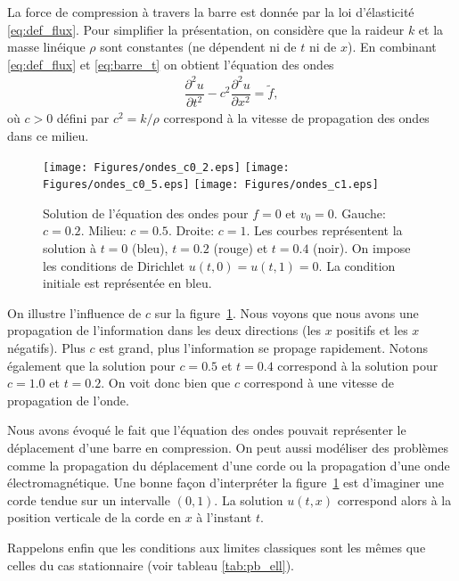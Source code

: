 \documentclass[12pt,a4paper,twoside]{article}
\begin{document}
La force de compression \`a travers la barre est donn\'ee par la loi d'\'elasticit\'e
\eqref{eq:def_flux}.
Pour simplifier la pr\'esentation, on consid\`ere que la raideur $k$ et la masse
lin\'eique $\rho$ sont constantes (ne d\'ependent ni de $t$ ni de $x$).
En combinant \eqref{eq:def_flux} et \eqref{eq:barre_t} on obtient l'\'equation des ondes
\begin{align}
  \label{eq:ondes}
  \dfrac{\partial^2 u}{\partial t^2} - c^2 \dfrac{\partial^2 u}{\partial x^2} = \widetilde{f} ,
\end{align}
o\`u $c>0$ d\'efini par $c^2 = k/\rho$ correspond \`a la vitesse de propagation
des ondes dans ce milieu.



\begin{figure}[h]
  \centering
  \texttt{[image: Figures/ondes\_c0\_2.eps]}
  \texttt{[image: Figures/ondes\_c0\_5.eps]}
  \texttt{[image: Figures/ondes\_c1.eps]}
  \caption{Solution de l'\'equation des ondes pour $f=0$ et $v_0 = 0$.
  Gauche: $c = 0.2$. Milieu: $c=0.5$. Droite: $c=1$.
  Les courbes repr\'esentent la solution \`a $t=0$ (bleu),
  $t=0.2$ (rouge) et $t=0.4$ (noir). On impose les conditions de Dirichlet $u(t,0) = u(t,1) = 0$.
  La condition initiale est repr\'esent\'ee en bleu.}
  \label{fig:ondes_c}
\end{figure}


On illustre l'influence de $c$ sur la figure~\ref{fig:ondes_c}.
Nous voyons que nous avons une propagation de l'information 
dans les deux directions (les $x$ positifs et les $x$ n\'egatifs).
Plus $c$ est grand, plus l'information se propage rapidement.
Notons \'egalement que la solution pour $c=0.5$ et $t=0.4$
correspond \`a la solution pour $c=1.0$ et $t=0.2$.
On voit donc bien que $c$ correspond \`a une vitesse de propagation
de l'onde.


Nous avons \'evoqu\'e le fait que l'\'equation des ondes
pouvait repr\'esenter le d\'eplacement d'une barre en compression.
On peut aussi mod\'eliser des probl\`emes 
comme la propagation du d\'eplacement d'une corde ou
la propagation d'une onde \'electromagn\'etique.
Une bonne fa\c{c}on d'interpr\'eter la figure~\ref{fig:ondes_c}
est d'imaginer une corde tendue sur un intervalle $(0,1)$.
La solution $u(t,x)$ correspond alors \`a la position verticale de la corde
en $x$ \`a l'instant $t$.


Rappelons enfin que les conditions aux limites classiques sont 
les m\^emes que celles du cas stationnaire
(voir tableau \ref{tab:pb_ell}).
\end{document}
